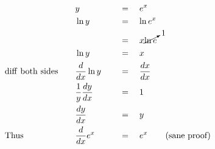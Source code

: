 \begin{alignat*}{5}
&\,&&y\quad&&\,=\quad e^x\\
&\,&&\ln{y}\quad&&\,=\quad\ln{e^x}\\
&\,&&\,\quad&&\,=\quad x\cancelto{1}{\ln{e}}\\
&\,&&\ln{y}\quad&&\,=\quad x\\
&\mathrm{diff~both~sides}\quad&&\frac{d}{dx}\ln{y}\quad&&\,=\quad \frac{dx}{dx}\\
&\,&&\frac{1}{y}\frac{dy}{dx}\quad&&\,=\quad1\\
&\,&&\frac{dy}{dx}\quad&&\,=\quad y\\
&\mathrm{Thus}\quad&&\frac{d}{dx}e^x\quad&&\,=\quad e^x&&\mathrm{(sane~proof)}
\end{alignat*}
